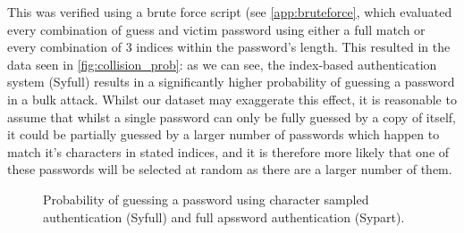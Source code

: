 \documentclass[british,10pt,a4paper]{article}
\begin{document}
This was verified using a brute force script (see \autoref{app:bruteforce}, which evaluated every combination of guess and victim password using either a full match or every combination of 3 indices within the password's length. This resulted in the data seen in \autoref{fig:collision_prob}: as we can see, the index-based authentication system (Syfull) results in a significantly higher probability of guessing a password in a bulk attack. Whilst our dataset may exaggerate this effect, it is reasonable to assume that whilst a single password can only be fully guessed by a copy of itself, it could be partially guessed by a larger number of passwords which happen to match it's characters in stated indices, and it is therefore more likely that one of these passwords will be selected at random as there are a larger number of them. 
\begin{figure}
	\caption{Probability of guessing a password using character sampled authentication (Syfull) and full apssword authentication (Sypart).}
	\label{fig:collision_prob}
\end{figure}
\end{document}
